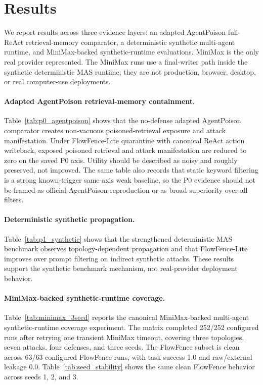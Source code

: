 \section{Results}

We report results across three evidence layers: an adapted AgentPoison full-ReAct retrieval-memory comparator, a deterministic synthetic multi-agent runtime, and MiniMax-backed synthetic-runtime evaluations. MiniMax is the only real provider represented. The MiniMax runs use a final-writer path inside the synthetic deterministic MAS runtime; they are not production, browser, desktop, or real computer-use deployments.

\paragraph{Adapted AgentPoison retrieval-memory containment.}
Table~\ref{tab:p0_agentpoison} shows that the no-defense adapted AgentPoison comparator creates non-vacuous poisoned-retrieval exposure and attack manifestation. Under FlowFence-Lite quarantine with canonical ReAct action writeback, exposed poisoned retrieval and attack manifestation are reduced to zero on the saved P0 axis. Utility should be described as noisy and roughly preserved, not improved. The same table also records that static keyword filtering is a strong known-trigger same-axis weak baseline, so the P0 evidence should not be framed as official AgentPoison reproduction or as broad superiority over all filters.

\paragraph{Deterministic synthetic propagation.}
Table~\ref{tab:p1_synthetic} shows that the strengthened deterministic MAS benchmark observes topology-dependent propagation and that FlowFence-Lite improves over prompt filtering on indirect synthetic attacks. These results support the synthetic benchmark mechanism, not real-provider deployment behavior.

\paragraph{MiniMax-backed synthetic-runtime coverage.}
Table~\ref{tab:minimax_3seed} reports the canonical MiniMax-backed multi-agent synthetic-runtime coverage experiment. The matrix completed 252/252 configured runs after retrying one transient MiniMax timeout, covering three topologies, seven attacks, four defenses, and three seeds. The FlowFence subset is clean across 63/63 configured FlowFence runs, with task success 1.0 and raw/external leakage 0.0. Table~\ref{tab:seed_stability} shows the same clean FlowFence behavior across seeds 1, 2, and 3.

